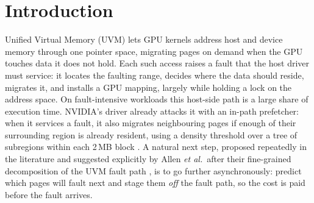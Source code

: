 %
%
%
%

\section{Introduction}

Unified Virtual Memory (UVM) lets GPU kernels address host and device memory
through one pointer space, migrating pages on demand when the GPU touches data
it does not hold. Each such access raises a fault that the host driver must
service: it locates the faulting range, decides where the data should reside,
migrates it, and installs a GPU mapping, largely while holding a lock on the
address space. On fault-intensive workloads this host-side path is a large
share of execution time. NVIDIA's driver already attacks it with an in-path
prefetcher: when it services a fault, it also migrates neighbouring pages if
enough of their surrounding region is already resident, using a density
threshold over a tree of subregions within each 2\,MB block
\cite{ganguly2019interplay}. A natural next step, proposed repeatedly in the
literature and suggested explicitly by Allen \emph{et al.}\ after their
fine-grained decomposition of the UVM fault path \cite{allen2024finegrain}, is
to go further asynchronously: predict which pages will fault next and stage
them \emph{off} the fault path, so the cost is paid before the fault arrives.

